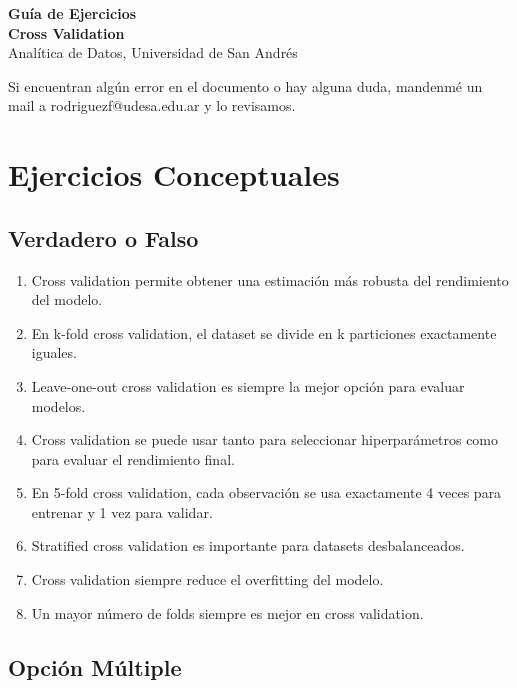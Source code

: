 \documentclass[12pt]{article}
\begin{document}
\begin{center}
  {\LARGE \textbf{Guía de Ejercicios\\Cross Validation}}\\[0.5em]
  {Analítica de Datos, Universidad de San Andrés}
\end{center}

Si encuentran algún error en el documento o hay alguna duda, mandenmé un mail a rodriguezf@udesa.edu.ar y lo revisamos.

\section{Ejercicios Conceptuales}

\subsection{Verdadero o Falso}

\begin{enumerate}
    \item Cross validation permite obtener una estimación más robusta del rendimiento del modelo.
    \item En k-fold cross validation, el dataset se divide en k particiones exactamente iguales.
    \item Leave-one-out cross validation es siempre la mejor opción para evaluar modelos.
    \item Cross validation se puede usar tanto para seleccionar hiperparámetros como para evaluar el rendimiento final.
    \item En 5-fold cross validation, cada observación se usa exactamente 4 veces para entrenar y 1 vez para validar.
    \item Stratified cross validation es importante para datasets desbalanceados.
    \item Cross validation siempre reduce el overfitting del modelo.
    \item Un mayor número de folds siempre es mejor en cross validation.
\end{enumerate}

\subsection{Opción Múltiple}
\end{document}

